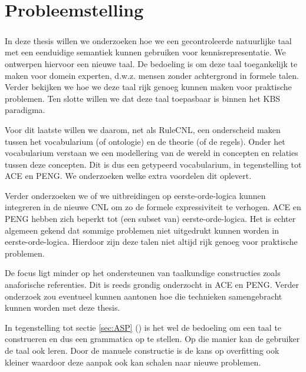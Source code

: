 \chapter{Probleemstelling}
\paragraph{} In deze thesis willen we onderzoeken hoe we een gecontroleerde natuurlijke taal met een eenduidige semantiek kunnen gebruiken voor kennisrepresentatie. We ontwerpen hiervoor een nieuwe taal. De bedoeling is om deze taal toegankelijk te maken voor domein experten, d.w.z. mensen zonder achtergrond in formele talen. Verder bekijken we hoe we deze taal rijk genoeg kunnen maken voor praktische problemen. Ten slotte willen we dat deze taal toepasbaar is binnen het KBS paradigma.

Voor dit laatste willen we daarom, net als RuleCNL, een onderscheid maken tussen het vocabularium (of ontologie) en de theorie (of de regels). Onder het vocabularium verstaan we een modellering van de wereld in concepten en relaties tussen deze concepten. Dit is dus een getypeerd vocabularium, in tegenstelling tot ACE en PENG. We onderzoeken welke extra voordelen dit oplevert. 

Verder onderzoeken we of we uitbreidingen op eerste-orde-logica kunnen integreren in de nieuwe CNL om zo de formele expressiviteit te verhogen. ACE en PENG hebben zich beperkt tot (een subset van) eerste-orde-logica. Het is echter algemeen gekend dat sommige problemen niet uitgedrukt kunnen worden in eerste-orde-logica. Hierdoor zijn deze talen niet altijd rijk genoeg voor praktische problemen.

De focus ligt minder op het ondersteunen van taalkundige constructies zoals anaforische referenties. Dit is reeds grondig onderzocht in ACE en PENG. Verder onderzoek zou eventueel kunnen aantonen hoe die technieken samengebracht kunnen worden met deze thesis.

In tegenstelling tot sectie \ref{sec:ASP} () is het wel de bedoeling om een taal te construeren en dus een grammatica op te stellen. Op die manier kan de gebruiker de taal ook leren. Door de manuele constructie is de kans op overfitting ook kleiner waardoor deze aanpak ook kan schalen naar nieuwe problemen.
